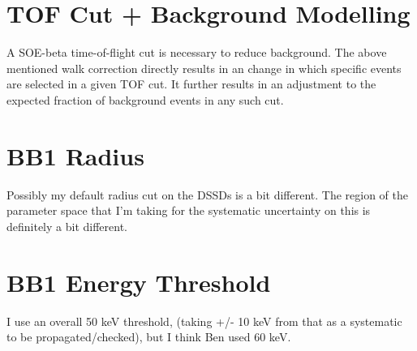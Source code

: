 \section{TOF Cut + Background Modelling}
	A SOE-beta time-of-flight cut is necessary to reduce background.  The above mentioned walk correction directly results in an change in which specific events are selected in a given TOF cut.  It further results in an adjustment to the expected fraction of background events in any such cut.
	
\section{BB1 Radius}
	Possibly my default radius cut on the DSSDs is a bit different.  The region of the parameter space that I'm taking for the systematic uncertainty on this is definitely a bit different.  
	

\section{BB1 Energy Threshold}
	I use an overall 50 keV threshold, (taking +/- 10 keV from that as a systematic to be propagated/checked), but I think Ben used 60 keV.  
	
